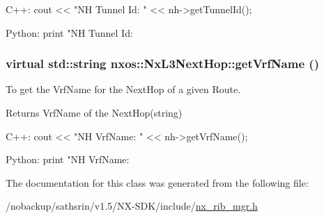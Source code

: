 \begin{DoxyCode}
  C++:
       cout << "NH Tunnel Id: " << nh->getTunnelId();

  Python:
       print "NH Tunnel Id: %
\end{DoxyCode}
 \hypertarget{classnxos_1_1NxL3NextHop_ab4488d93cc0df12157430dd86f5f4242}{
\subsubsection[{getVrfName}]{\setlength{\rightskip}{0pt plus 5cm}virtual std::string nxos::NxL3NextHop::getVrfName ()}}
\label{classnxos_1_1NxL3NextHop_ab4488d93cc0df12157430dd86f5f4242}
To get the VrfName for the NextHop of a given Route.

\begin{DoxyReturn}{Returns}
VrfName of the NextHop(string)
\end{DoxyReturn}

\begin{DoxyCode}
  C++:
       cout << "NH VrfName: " << nh->getVrfName();

  Python:
       print "NH VrfName: %
\end{DoxyCode}
 

The documentation for this class was generated from the following file:\begin{DoxyCompactItemize}
\item 
/nobackup/sathsrin/v1.5/NX-\/SDK/include/\hyperlink{nx__rib__mgr_8h}{nx\_\-rib\_\-mgr.h}\end{DoxyCompactItemize}
